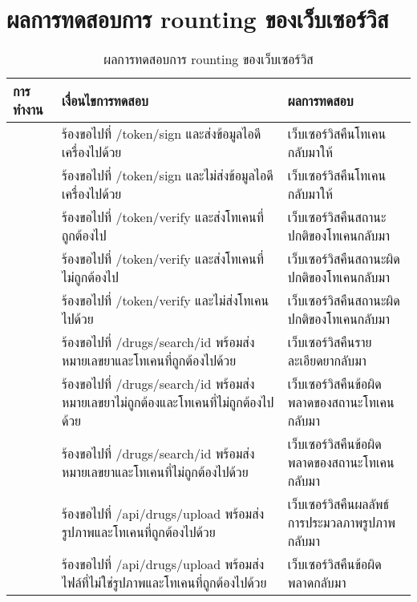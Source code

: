 \section{ผลการทดสอบการ rounting ของเว็บเซอร์วิส}
	\begin{table}[H]
		\caption{ผลการทดสอบการ rounting ของเว็บเซอร์วิส}
		\centering	
		\label{tab:test5}
		\begin{tabular}{ | p{4.5cm} | p{4.5cm} | p{4.5cm} | }
		\hline
		การทำงาน & เงื่อนไขการทดสอบ & ผลการทดสอบ \\ \hline
		\setstretch{1}{ร้องรอทรัพยากรจากเว็บเซอร์วิส}
		& \setstretch{1} {ร้องขอไปที่ /token/sign และส่งข้อมูลไอดีเครื่องไปด้วย}
		& \setstretch{1} {เว็บเซอร์วิสคืนโทเคนกลับมาให้} \\ \cline{2-3} 
		& \setstretch{1} {ร้องขอไปที่ /token/sign และไม่ส่งข้อมูลไอดีเครื่องไปด้วย} 
		& \setstretch{1} {เว็บเซอร์วิสคืนโทเคนกลับมาให้} \\ \cline{2-3} 
		& \setstretch{1} {ร้องขอไปที่ /token/verify และส่งโทเคนที่ถูกต้องไป} 
		& \setstretch{1} {เว็บเซอร์วิสคืนสถานะปกติของโทเคนกลับมา} \\ \cline{2-3} 
		& \setstretch{1} {ร้องขอไปที่ /token/verify และส่งโทเคนที่ไม่ถูกต้องไป} 
		& \setstretch{1} {เว็บเซอร์วิสคืนสถานะผิดปกติของโทเคนกลับมา} \\ \cline{2-3} 
		& \setstretch{1} {ร้องขอไปที่ /token/verify และไม่ส่งโทเคนไปด้วย} 
		& \setstretch{1} {เว็บเซอร์วิสคืนสถานะผิดปกติของโทเคนกลับมา} \\ \cline{2-3} 
		& \setstretch{1} {ร้องขอไปที่ /drugs/search/id พร้อมส่งหมายเลขยาและโทเคนที่ถูกต้องไปด้วย} 
		& \setstretch{1} {เว็บเซอร์วิสคืนรายละเอียดยากลับมา} \\ \cline{2-3} 
		& \setstretch{1} {ร้องขอไปที่ /drugs/search/id พร้อมส่งหมายเลขยาไม่ถูกต้องและโทเคนที่ไม่ถูกต้องไปด้วย} 
		& \setstretch{1} {เว็บเซอร์วิสคืนข้อผิดพลาดของสถานะโทเคนกลับมา} \\ \cline{2-3} 
		& \setstretch{1} {ร้องขอไปที่ /drugs/search/id พร้อมส่งหมายเลขยาและโทเคนที่ไม่ถูกต้องไปด้วย}
		& \setstretch{1} {เว็บเซอร์วิสคืนข้อผิดพลาดของสถานะโทเคนกลับมา} \\ \cline{2-3} 
		& \setstretch{1} {ร้องขอไปที่ /api/drugs/upload พร้อมส่งรูปภาพและโทเคนที่ถูกต้องไปด้วย} 
		& \setstretch{1} {เว็บเซอร์วิสคืนผลลัพธ์การประมวลภาพรูปภาพกลับมา} \\ \cline{2-3} 
		& \setstretch{1} {ร้องขอไปที่ /api/drugs/upload พร้อมส่งไฟล์ที่ไม่ใช่รูปภาพและโทเคนที่ถูกต้องไปด้วย}
		& \setstretch{1} {เว็บเซอร์วิสคืนข้อผิดพลาดกลับมา} \\ \hline
		\end{tabular}
	\end{table}

